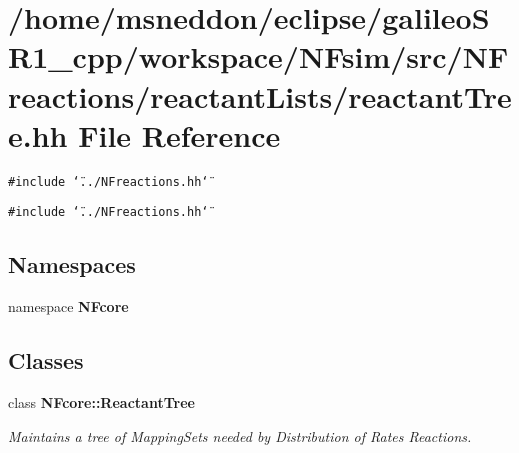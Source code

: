 \section{/home/msneddon/eclipse/galileoSR1\_\-cpp/workspace/NFsim/src/NFreactions/reactantLists/reactantTree.hh File Reference}
\label{reactantTree_8hh}


{\tt \#include \char`\"{}../NFreactions.hh\char`\"{}}\par
{\tt \#include \char`\"{}../NFreactions.hh\char`\"{}}\par
\subsection*{Namespaces}
\begin{CompactItemize}
\item 
namespace {\bf NFcore}
\end{CompactItemize}
\subsection*{Classes}
\begin{CompactItemize}
\item 
class {\bf NFcore::ReactantTree}
\begin{CompactList}\small\item\em Maintains a tree of MappingSets needed by Distribution of Rates Reactions. \item\end{CompactList}\end{CompactItemize}
